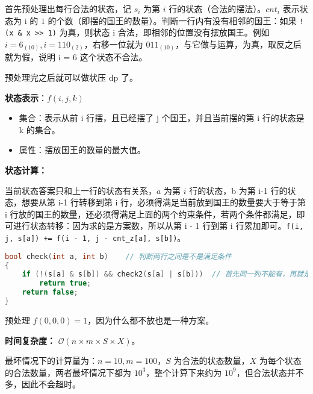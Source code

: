 首先预处理出每行合法的状态，记 $s_i$ 为第 $i$ 行的状态（合法的摆法）。$cnt_i$ 表示状态为 i 的 $1$ 的个数（即摆的国王的数量）。判断一行内有没有相邻的国王：如果 \verb|!(x & x >> 1)| 为真，则状态 i 合法，即相邻的位置没有摆放国王。例如 $i = 6_{(10)}, i = 110_{(2)}$，右移一位就为 $011_{(10)}$，与它做与运算，为真，取反之后就为假，说明 i = 6 这个状态不合法。

预处理完之后就可以做状压 dp 了。

\textbf{状态表示}：$f(i, j, k)$
\begin{itemize}
\item 集合：表示从前 i 行摆，且已经摆了 j 个国王，并且当前摆的第 i 行的状态是 k 的集合。
\item 属性：摆放国王的数量的最大值。
\end{itemize}

\textbf{状态计算：}

当前状态答案只和上一行的状态有关系，$a$ 为第 $i$ 行的状态，b 为第 i-1 行的状态，想要从第 i-1 行转移到第 i 行，必须得满足当前放到国王的数量要大于等于第 i 行放的国王的数量，还必须得满足上面的两个约束条件，若两个条件都满足，即可进行状态转移：因为求的是方案数，所以从第 i - 1 行到第 i 行累加即可。\verb|f(i, j, s[a]) += f(i - 1, j - cnt_z[a], s[b])|。

\begin{lstlisting}[language=cpp]
bool check(int a, int b)    // 判断两行之间是不是满足条件
{
    if (!(s[a] & s[b]) && check2(s[a] | s[b]))  // 首先同一列不能有，再就是同一对角线也不能有相邻的国王
        return true;
    return false;
}
\end{lstlisting}

预处理 $f(0, 0, 0) = 1$，因为什么都不放也是一种方案。

\textbf{时间复杂度：} $\mathcal{O}(n \times m \times S \times X)$。

最坏情况下的计算量为：$n = 10, m = 100$，$S$ 为合法的状态数量，$X$ 为每个状态的合法数量，两者最坏情况下都为 $10^3$，整个计算下来约为 $10^9$，但合法状态并不多，因此不会超时。

